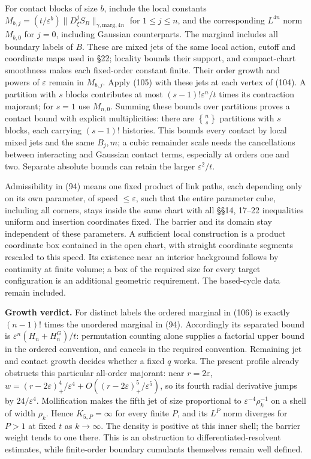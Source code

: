\documentclass[11pt,a4paper]{article}
\begin{document}
For contact blocks of size \(b\), include the local constants
\(M_{b,j}=(t/\varepsilon^b)\|D_\xi^jS_B\|_{\gamma,\mathrm{marg},4n}\)
for \(1\le j\le n\), and the corresponding \(L^{4n}\) norm \(M_{b,0}\)
for \(j=0\), including Gaussian counterparts. The marginal includes all
boundary labels of \(B\). These are mixed jets of the same local action,
cutoff and coordinate maps used in §22; locality bounds their support,
and compact-chart smoothness makes each fixed-order constant finite.
Their order growth and powers of \(\varepsilon\) remain in \(M_{b,j}\).
Apply (105) with these jets at each vertex of (104). A partition with
\(s\) blocks contributes at most \((s-1)!\varepsilon^n/t\) times its
contraction majorant; for \(s=1\) use \(M_{n,0}\). Summing these bounds
over partitions proves a contact bound with explicit multiplicities:
there are \({n\brace s}\) partitions with \(s\) blocks, each carrying
\((s-1)!\) histories. This bounds every contact by local mixed jets and
the same \(B_j,m\); a cubic remainder scale needs the cancellations
between interacting and Gaussian contact terms, especially at orders one
and two. Separate absolute bounds can retain the larger
\(\varepsilon^2/t\).

Admissibility in (94) means one fixed product of link paths, each
depending only on its own parameter, of speed \(\le\varepsilon\), such
that the entire parameter cube, including all corners, stays inside the
same chart with all §§14, 17--22 inequalities uniform and insertion
coordinates fixed. The barrier and its domain stay independent of these
parameters. A sufficient local construction is a product coordinate box
contained in the open chart, with straight coordinate segments rescaled
to this speed. Its existence near an interior background follows by
continuity at finite volume; a box of the required size for every target
configuration is an additional geometric requirement. The based-cycle
data remain included.

\textbf{Growth verdict.} For distinct labels the ordered marginal in
(106) is exactly \((n-1)!\) times the unordered marginal in (94).
Accordingly its separated bound is \(\varepsilon^n(H_n+H_n^G)/t\):
permutation counting alone supplies a factorial upper bound in the
ordered convention, and cancels in the required convention. Remaining
jet and contact growth decides whether a fixed \(q\) works. The present
profile already obstructs this particular all-order majorant: near
\(r=2\varepsilon\),
\(w=(r-2\varepsilon)_+^4/ \varepsilon^4+O((r-2\varepsilon)_+^5/\varepsilon^5)\),
so its fourth radial derivative jumps by \(24/\varepsilon^4\).
Mollification makes the fifth jet of size proportional to
\(\varepsilon^{-4}\rho_k^{-1}\) on a shell of width \(\rho_k\). Hence
\(K_{5,P}=\infty\) for every finite \(P\), and its \(L^P\) norm diverges
for \(P>1\) at fixed \(t\) as \(k\to\infty\). The density is positive at
this inner shell; the barrier weight tends to one there. This is an
obstruction to differentiated-resolvent estimates, while finite-order
boundary cumulants themselves remain well defined.
\end{document}
